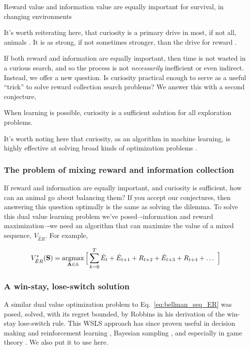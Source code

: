 \begin{conjecture}
	Reward value and information value are equally important for survival, in changing environments 
\end{conjecture}

It's worth reiterating here, that curiosity is a primary drive in most, if not all, animals \cite{Inglis2001}. It is as strong, if not sometimes stronger, than the drive for reward \cite{Loewenstein1994,Kidd2015,Gottlieb2018}.

If both reward and information are equally important, then time is not wasted in a curious search, and so the process is not \textit{necessarily} inefficient or even indirect. Instead, we offer a new question. Is curiosity practical enough to serve as a useful ``trick'' to solve reward collection search problems? We answer this with a second conjecture,

\begin{conjecture}
	When learning is possible, curiosity is a sufficient solution for all exploration problems.
\end{conjecture}

It's worth noting here that curiosity, as an algorithm in machine learning, is highly effective at solving broad kinds of optimization problems \cite{Schmidhuber1991,Stanton2018,Lehman2010,Mouret2011,Fister2019,Mouret2015,Colas2020,Cully2015,Pathak2017,Laversanne-Finot2018}. 

\subsubsection*{The problem of mixing reward and information collection}
If reward and information are equally important, and curiosity is sufficient, how can an animal go about balancing them? If you accept our conjectures, then answering this question optimally is the same as solving the dilemma. To solve this dual value learning problem we’ve posed–-information and reward maximization–-we need an algorithm that can maximize the value of a mixed sequence, $V_{\hat{E}R}$. For example,

\begin{equation}
	\label{eq:bellman_seq_ER}
	V^*_{\hat{E}R}(\mathbf{S}) = \operatorname*{argmax}_{\mathbf{A} \in \mathbb{A}} \Big [\sum_{k=0}^{T} \hat{E}_t + \hat{E}_{t+1} + R_{t+2} + \hat{E}_{t+3} + R_{t+4} + \ldots  \ \Big ]
\end{equation}

\subsubsection*{A win-stay, lose-switch solution}
A similar dual value optimization problem to Eq.~\ref{eq:bellman_seq_ER} was posed, solved, with its regret bounded, by Robbins \cite{Robbins1952} in his derivation of the win-stay lose-switch rule. This WSLS approach has since proven useful in decision making and reinforcement learning \cite{Estes1994TowardAS,Worthy2014}, Bayesian sampling \cite{Bonawitz2014}, and especially in game theory \cite{Nowak1993}. We also put it to use here. 

